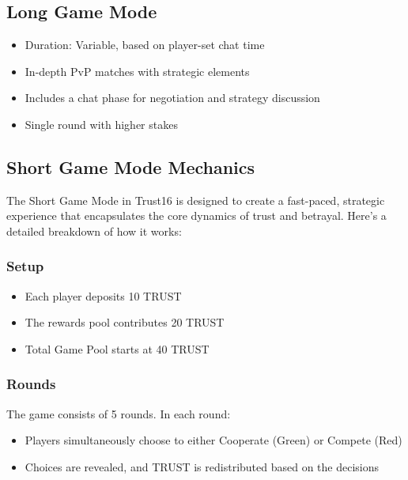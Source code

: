 \documentclass[12pt,a4paper]{article}
\begin{document}
\subsection{Long Game Mode}
\begin{itemize}
    \item Duration: Variable, based on player-set chat time
    \item In-depth PvP matches with strategic elements
    \item Includes a chat phase for negotiation and strategy discussion
    \item Single round with higher stakes
\end{itemize}

\subsection{Short Game Mode Mechanics}
The Short Game Mode in Trust16 is designed to create a fast-paced, strategic experience that encapsulates the core dynamics of trust and betrayal. Here's a detailed breakdown of how it works:

\subsubsection{Setup}
\begin{itemize}
    \item Each player deposits 10 TRUST
    \item The rewards pool contributes 20 TRUST
    \item Total Game Pool starts at 40 TRUST
\end{itemize}

\subsubsection{Rounds}
The game consists of 5 rounds. In each round:
\begin{itemize}
    \item Players simultaneously choose to either Cooperate (Green) or Compete (Red)
    \item Choices are revealed, and TRUST is redistributed based on the decisions
\end{itemize}
\end{document}
